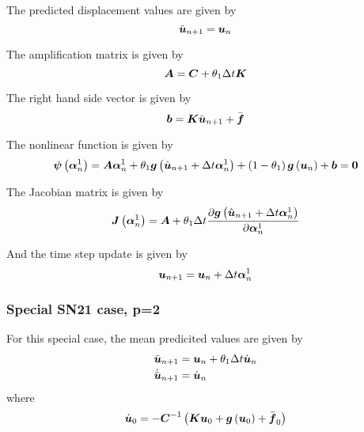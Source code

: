 The predicted displacement values are given by
\begin{equation}
   \hat{\vect{u}}_{n+1} = \vect{u}_{n}
\end{equation}

The amplification matrix is given by
\begin{equation}
  \matr{A}=\matr{C}+\theta_{1}\Delta t \matr{K}
\end{equation}

The right hand side vector is given by
\begin{equation}
  \vect{b}=\matr{K}\bar{\vect{u}}_{n+1}+\bar{\vect{f}}
\end{equation}

The nonlinear function is given by
\begin{equation}
  \fnof{\vect{\psi}}{\vect{\alpha}^{1}_{n}}=\matr{A}\vect{\alpha}^{1}_{n}+\theta_{1}\fnof{\vect{g}}{\hat{\vect{u}}_{n+1}+ 
    \Delta t\vect{\alpha}^{1}_{n}}+\pbrac{1-\theta_{1}}\fnof{\vect{g}}{\vect{u}_{n}}+\vect{b}=\vect{0}
\end{equation}

The Jacobian matrix is given by
\begin{equation}
  \fnof{\matr{J}}{\vect{\alpha}^{1}_{n}}=\matr{A}+\theta_{1}\Delta t
  \delby{\fnof{\vect{g}}{\hat{\vect{u}}_{n+1}+\Delta t\vect{\alpha}^{1}_{n}}}{\vect{\alpha}^{1}_{n}}
\end{equation}

And the time step update is given by
\begin{equation}
    \vect{u}_{n+1} = \vect{u}_{n}+\Delta t\vect{\alpha}^{1}_{n}
\end{equation}

\subsubsection{Special SN21 case, p=2}

For this special case, the mean predicited values are given by
\begin{equation}
  \begin{split}
    \bar{\vect{u}}_{n+1} &= \vect{u}_{n}+\theta_{1}\Delta t\dot{\vect{u}}_{n}\\
    \dot{\bar{\vect{u}}}_{n+1} &= \dot{\vect{u}}_{n}
  \end{split}
\end{equation}
where
\begin{equation}
  \dot{\vect{u}}_{0}=-\inverse{\matr{C}}\pbrac{\matr{K}\vect{u}_{0}+\fnof{\vect{g}}{\vect{u}_{0}}+\bar{\vect{f}}_{0}}
\end{equation}

